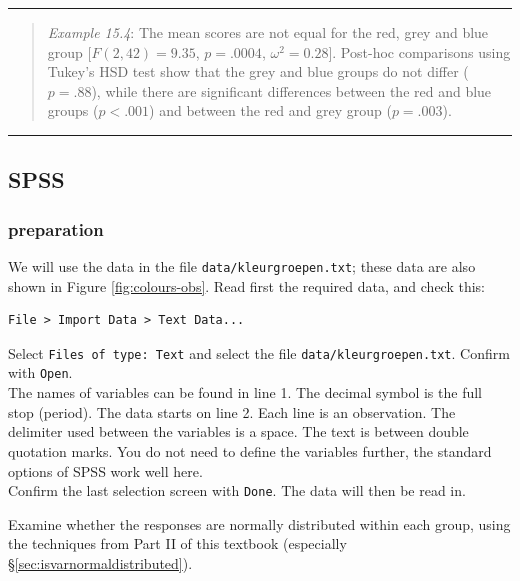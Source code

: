 \documentclass[
]{book}
\begin{document}
\begin{center}\rule{0.5\linewidth}{0.5pt}\end{center}

\begin{quote}
\emph{Example 15.4}:
The mean scores are not equal for the red, grey and blue group
\([F(2,42) = 9.35\), \(p = .0004\), \(\omega^2 = 0.28]\).
Post-hoc comparisons using Tukey's HSD test show that the grey and blue groups do not differ (\(p=.88\)), while there are significant differences between the red and blue groups (\(p<.001\)) and between the red and grey group (\(p=.003\)).
\end{quote}

\begin{center}\rule{0.5\linewidth}{0.5pt}\end{center}

\hypertarget{spss-12}{%
\subsection{SPSS}\label{spss-12}}

\hypertarget{preparation-1}{%
\subsubsection{preparation}\label{preparation-1}}

We will use the data in the file \texttt{data/kleurgroepen.txt}; these data are also shown in Figure \ref{fig:colours-obs}.
Read first the required data, and check this:

\begin{verbatim}
File > Import Data > Text Data...
\end{verbatim}

Select \texttt{Files\ of\ type:\ Text} and select the file
\texttt{data/kleurgroepen.txt}. Confirm with \texttt{Open}.\\
The names of variables can be found in line 1. The decimal symbol is
the full stop (period). The data starts on line 2. Each line is an observation.
The delimiter used between the variables is a space. The text is between
double quotation marks. You do not need to define the variables further,
the standard options of SPSS work well here.\\
Confirm the last selection screen with \texttt{Done}. The data will
then be read in.

Examine whether the responses are normally distributed within each group, using the
techniques from Part II of this textbook (especially
§\ref{sec:isvarnormaldistributed}).
\end{document}
